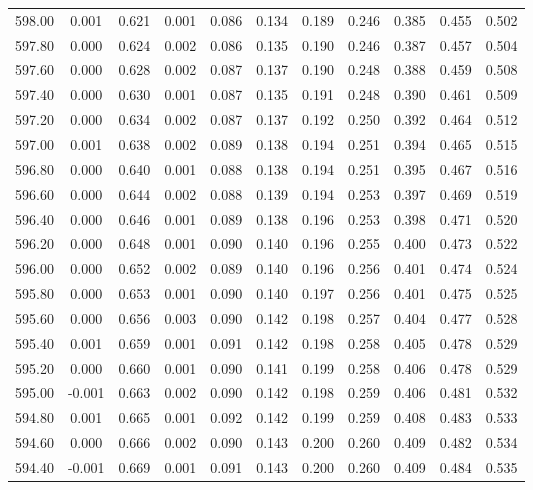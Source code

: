 \begin{longtable}{cccccccccc}
    598.00 &  0.001 &  0.621 &  0.001 &  0.086 &  0.134 &  0.189 &  0.246 &  0.385 &  0.455 &  0.502 \\
    597.80 &  0.000 &  0.624 &  0.002 &  0.086 &  0.135 &  0.190 &  0.246 &  0.387 &  0.457 &  0.504 \\
    597.60 &  0.000 &  0.628 &  0.002 &  0.087 &  0.137 &  0.190 &  0.248 &  0.388 &  0.459 &  0.508 \\
    597.40 &  0.000 &  0.630 &  0.001 &  0.087 &  0.135 &  0.191 &  0.248 &  0.390 &  0.461 &  0.509 \\
    597.20 &  0.000 &  0.634 &  0.002 &  0.087 &  0.137 &  0.192 &  0.250 &  0.392 &  0.464 &  0.512 \\
    597.00 &  0.001 &  0.638 &  0.002 &  0.089 &  0.138 &  0.194 &  0.251 &  0.394 &  0.465 &  0.515 \\
    596.80 &  0.000 &  0.640 &  0.001 &  0.088 &  0.138 &  0.194 &  0.251 &  0.395 &  0.467 &  0.516 \\
    596.60 &  0.000 &  0.644 &  0.002 &  0.088 &  0.139 &  0.194 &  0.253 &  0.397 &  0.469 &  0.519 \\
    596.40 &  0.000 &  0.646 &  0.001 &  0.089 &  0.138 &  0.196 &  0.253 &  0.398 &  0.471 &  0.520 \\
    596.20 &  0.000 &  0.648 &  0.001 &  0.090 &  0.140 &  0.196 &  0.255 &  0.400 &  0.473 &  0.522 \\
    596.00 &  0.000 &  0.652 &  0.002 &  0.089 &  0.140 &  0.196 &  0.256 &  0.401 &  0.474 &  0.524 \\
    595.80 &  0.000 &  0.653 &  0.001 &  0.090 &  0.140 &  0.197 &  0.256 &  0.401 &  0.475 &  0.525 \\
    595.60 &  0.000 &  0.656 &  0.003 &  0.090 &  0.142 &  0.198 &  0.257 &  0.404 &  0.477 &  0.528 \\
    595.40 &  0.001 &  0.659 &  0.001 &  0.091 &  0.142 &  0.198 &  0.258 &  0.405 &  0.478 &  0.529 \\
    595.20 &  0.000 &  0.660 &  0.001 &  0.090 &  0.141 &  0.199 &  0.258 &  0.406 &  0.478 &  0.529 \\
    595.00 & -0.001 &  0.663 &  0.002 &  0.090 &  0.142 &  0.198 &  0.259 &  0.406 &  0.481 &  0.532 \\
    594.80 &  0.001 &  0.665 &  0.001 &  0.092 &  0.142 &  0.199 &  0.259 &  0.408 &  0.483 &  0.533 \\
    594.60 &  0.000 &  0.666 &  0.002 &  0.090 &  0.143 &  0.200 &  0.260 &  0.409 &  0.482 &  0.534 \\
    594.40 & -0.001 &  0.669 &  0.001 &  0.091 &  0.143 &  0.200 &  0.260 &  0.409 &  0.484 &  0.535 \\

\end{longtable}
